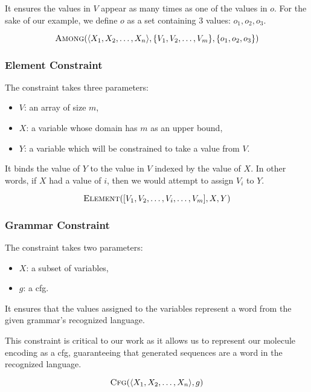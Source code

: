 \documentclass[../Document.tex]{subfiles}
\begin{document}
It ensures the values in $V$ appear as many times as one of the values in $o$.
For the sake of our example, we define $o$ as a set containing 3 values: $o_1, o_2, o_3$.

$$
    \mbox{\sc Among}(\langle X_1, X_2, \ldots, X_n \rangle, \{V_1, V_2, \ldots, V_m\}, \{o_1, o_2, o_3\})
$$

\subsubsection{Element Constraint}
The \element constraint takes three parameters:
\begin{itemize}
    \item $V$: an array of size $m$,
    \item $X$: a variable whose domain has $m$ as an upper bound,
    \item $Y$: a variable which will be constrained to take a value from $V$.
\end{itemize}

It binds the value of $Y$ to the value in $V$ indexed by the value of $X$. In other words, if $X$ had a value of $i$, then we would attempt to assign $V_i$ to $Y$.

$$
    \mbox{\sc Element}([V_1, V_2, \ldots, V_i, \ldots, V_m], X, Y)
$$

\subsubsection{Grammar Constraint}
The \grammar constraint takes two parameters:
\begin{itemize}
    \item $X$: a subset of variables,
    \item $g$: a \acrfull{cfg}.
\end{itemize}

It ensures that the values assigned to the variables represent a word from the given grammar's recognized language.

This constraint is critical to our work as it allows us to represent our molecule encoding as a \gls{cfg}, guaranteeing that generated sequences are a word in the recognized language.

$$
    \mbox{\sc Cfg}(\langle X_1, X_2, \ldots, X_n \rangle, g)
$$
\end{document}
